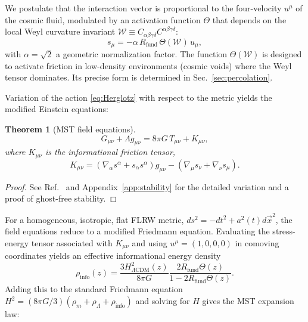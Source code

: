 \documentclass[12pt,a4paper]{article}
\theoremstyle{plain}
\newtheorem{theorem}{Theorem}[section]
\theoremstyle{definition}
\theoremstyle{remark}
\begin{document}
We postulate that the interaction vector is proportional to the four-velocity \(u^\mu\) of the cosmic fluid, modulated by an activation function \(\Theta\) that depends on the local Weyl curvature invariant \(\mathcal{W} \equiv C_{\alpha\beta\gamma\delta}C^{\alpha\beta\gamma\delta}\):
\begin{equation}
s_\mu = -\alpha\, R_{\text{fund}}\, \Theta(\mathcal{W})\, u_\mu,
\label{eq:smu}
\end{equation}
with \(\alpha = \sqrt{2}\) a geometric normalization factor. The function \(\Theta(\mathcal{W})\) is designed to activate friction in low-density environments (cosmic voids) where the Weyl tensor dominates. Its precise form is determined in Sec.~\ref{sec:percolation}.

Variation of the action \eqref{eq:Herglotz} with respect to the metric yields the modified Einstein equations:
\begin{theorem}[MST field equations]
\label{thm:field}
\begin{equation}
G_{\mu\nu} + \Lambda g_{\mu\nu} = 8\pi G\, T_{\mu\nu} + K_{\mu\nu},
\label{eq:field}
\end{equation}
where \(K_{\mu\nu}\) is the informational friction tensor,
\begin{equation}
K_{\mu\nu} = (\nabla_\alpha s^\alpha + s_\alpha s^\alpha) g_{\mu\nu} - (\nabla_\mu s_\nu + \nabla_\nu s_\mu).
\end{equation}
\end{theorem}

\begin{proof}
See Ref.~\cite{MSTfound} and Appendix~\ref{app:stability} for the detailed variation and a proof of ghost-free stability.
\end{proof}

For a homogeneous, isotropic, flat FLRW metric, \(ds^2 = -dt^2 + a^2(t) d\vec{x}^2\), the field equations reduce to a modified Friedmann equation. Evaluating the stress-energy tensor associated with \(K_{\mu\nu}\) and using \(u^\mu = (1,0,0,0)\) in comoving coordinates yields an effective informational energy density
\begin{equation}
\rho_{\text{info}}(z) = \frac{3H_{\Lambda\text{CDM}}^2(z)}{8\pi G} \frac{2R_{\text{fund}}\Theta(z)}{1 - 2R_{\text{fund}}\Theta(z)}.
\label{eq:rhoinfo}
\end{equation}
Adding this to the standard Friedmann equation \(H^2 = (8\pi G/3)(\rho_m + \rho_\Lambda + \rho_{\text{info}})\) and solving for \(H\) gives the MST expansion law:
\end{document}
